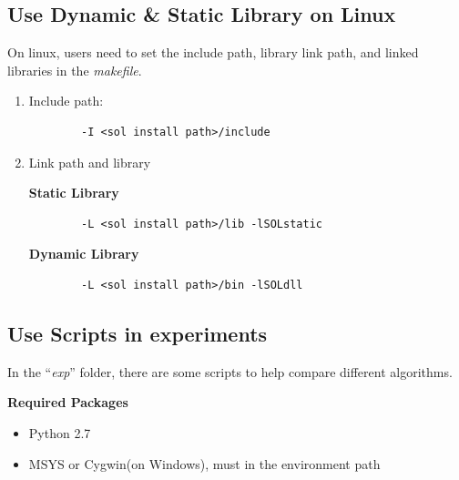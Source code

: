 \documentclass[11pt,a4paper]{article}
\newlength{\wideitemsep}
\let\olditem\item
\renewcommand{\item}{\setlength{\itemsep}{\wideitemsep}\olditem}
\begin{document}
\subsection{Use Dynamic \& Static Library on Linux}
On linux, users need to set the include path, library link path, and linked
libraries in the \emph{makefile}. 
\begin{enumerate}
    \item Include path: 
        \lstset{language=C++, 
            framexleftmargin=-1.5cm,
            xleftmargin=-1.5cm,
        }   
        \begin{lstlisting}
        -I <sol install path>/include
        \end{lstlisting}
    \item Link path and library

        \textbf{Static Library}
        \lstset{language=bash}
        \begin{lstlisting}
        -L <sol install path>/lib -lSOLstatic
        \end{lstlisting}
        \textbf{Dynamic Library}
        \lstset{language=bash}
        \begin{lstlisting}
        -L <sol install path>/bin -lSOLdll
        \end{lstlisting}
\end{enumerate}

\lstset{language=C++, 
    framexleftmargin=-1cm,
    xleftmargin=-1cm,
}
\subsection{Use Scripts in experiments}
In the ``\emph{exp}'' folder, there are some scripts to help compare different
algorithms.

\vspace{2mm}\hspace{-5mm}\textbf{Required Packages}
\begin{itemize}
    \item Python 2.7 
    \item MSYS or Cygwin(on Windows), must in the environment path
\end{itemize}
\end{document}

